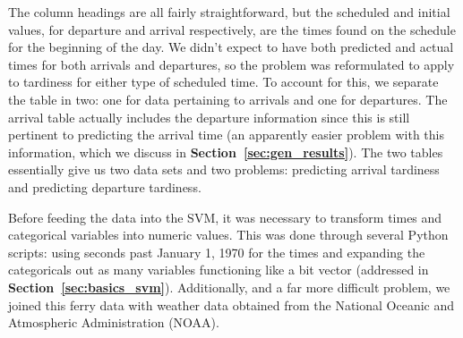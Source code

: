 \documentclass[11pt]{article} %
\begin{document}
The column headings are all fairly straightforward, but the
scheduled and initial values, for departure and arrival respectively, are the
times found on the schedule for the beginning of the day. We didn't expect to 
have both predicted and actual times for both arrivals and departures, so the
problem was reformulated to apply to tardiness for either type of scheduled
time. To account for this, we separate the table in two: one for
data pertaining to arrivals and one for departures. The arrival table actually 
includes the departure information since this is still pertinent to predicting
the arrival time (an apparently easier problem with this information, which we
discuss in \textbf{Section~\ref{sec:gen_results}}). The two tables essentially
give us two data sets and two problems: predicting arrival tardiness and predicting 
departure tardiness.

Before feeding the data into the SVM, it was necessary to transform times and 
categorical variables into numeric values. This was done through several Python
scripts: using seconds past January 1, 1970 for the times and expanding the 
categoricals out as many variables functioning like a bit vector (addressed in 
\textbf{Section~\ref{sec:basics_svm}}). Additionally,
and a far more difficult problem, we joined this ferry data with weather data
obtained from the National Oceanic and Atmospheric Administration (NOAA).

% 
% 
\end{document}
